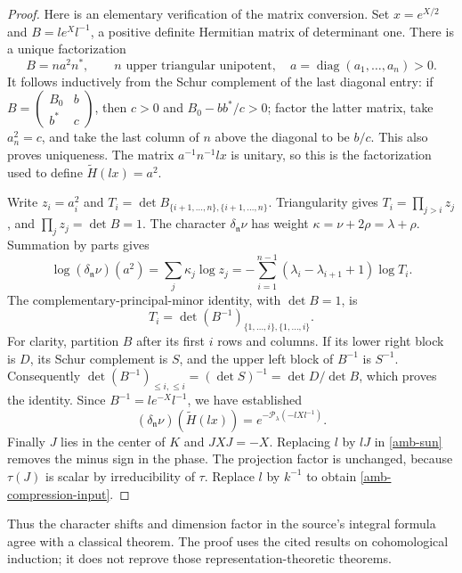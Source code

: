 \begin{proof}
Here is an elementary verification of the matrix conversion.
Set $x=e^{X/2}$ and $B=l e^X l^{-1}$, a positive definite
Hermitian matrix of determinant one. There is a unique
factorization
\[
                 B=n a^2 n^*,\qquad
       n\text{ upper triangular unipotent},\quad
       a=\operatorname{diag}(a_1,\ldots,a_n)>0.
\]
It follows inductively from the Schur complement of the
last diagonal entry: if
$B=\left(\begin{smallmatrix}B_0&b\\b^*&c\end{smallmatrix}\right)$,
then $c>0$ and $B_0-bb^*/c>0$; factor the latter matrix,
take $a_n^2=c$, and take the last column of $n$ above
the diagonal to be $b/c$. This also proves uniqueness.
The matrix $a^{-1}n^{-1}lx$ is unitary, so this is the
factorization used to define $\widetilde H(lx)=a^2$.

Write $z_i=a_i^2$ and
$T_i=\det B_{\{i+1,\ldots,n\},\{i+1,\ldots,n\}}$.
Triangularity gives
$T_i=\prod_{j>i}z_j$, and $\prod_j z_j=\det B=1$.
The character $\delta_{\mathfrak n}\nu$ has weight
$\kappa=\nu+2\rho=\lambda+\rho$. Summation by parts gives
\[
 \log(\delta_{\mathfrak n}\nu)(a^2)
    =\sum_j\kappa_j\log z_j
    =-\sum_{i=1}^{n-1}
             (\lambda_i-\lambda_{i+1}+1)\log T_i.
\]
The complementary-principal-minor identity, with $\det B=1$,
is
\[
       T_i=\det (B^{-1})_{\{1,\ldots,i\},\{1,\ldots,i\}}.
\]
For clarity, partition $B$ after its first $i$ rows
and columns. If its lower right block is $D$, its
Schur complement is $S$, and the upper left block of
$B^{-1}$ is $S^{-1}$. Consequently
$\det(B^{-1})_{\le i,\le i}=(\det S)^{-1}
 =\det D/\det B$, which proves the identity.
Since $B^{-1}=l e^{-X}l^{-1}$, we have established
\[
  (\delta_{\mathfrak n}\nu)(\widetilde H(lx))
                  =e^{-\mathcal P_\lambda(-lXl^{-1})}.
\]
Finally $J$ lies in the center of $K$ and $JXJ=-X$.
Replacing $l$ by $lJ$ in \eqref{amb-sun} removes the minus
sign in the phase. The projection factor is unchanged,
because $\tau(J)$ is scalar by irreducibility of $\tau$.
Replace $l$ by $k^{-1}$ to obtain
\eqref{amb-compression-input}.
\end{proof}

Thus the character shifts and dimension factor in the
source's integral formula agree with a classical theorem.
The proof uses the cited results on cohomological induction;
it does not reprove those representation-theoretic theorems.

